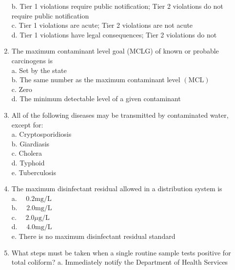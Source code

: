 \begin{enumerate}
b. Tier 1 violations require public notification; Tier 2 violations do not require public notification\\

c. Tier 1 violations are acute; Tier 2 violations are not acute\\

d. Tier 1 violations have legal consequences; Tier 2 violations do not\\


\item The maximum contaminant level goal (MCLG) of known or probable carcinogens is\\
a. Set by the state\\
b. The same number as the maximum contaminant level $(\mathrm{MCL})$\\
c. Zero\\
d. The minimum detectable level of a given contaminant\\

  \item All of the following diseases may be transmitted by contaminated water, except for:\\


a. Cryptosporidiosis\\

b. Giardiasis\\

c. Cholera\\

d. Typhoid\\

e. Tuberculosis\\


\item The maximum disinfectant residual allowed in a distribution system is\\

a. $\quad 0.2 \mathrm{mg} / \mathrm{L}$\\

b. $\quad 2.0 \mathrm{mg} / \mathrm{L}$\\

c. $\quad 2.0 \mu \mathrm{g} / \mathrm{L}$\\

d. $\quad 4.0 \mathrm{mg} / \mathrm{L}$\\

e. There is no maximum disinfectant residual standard\\

\item What steps must be taken when a single routine sample tests positive for total coliform?
a. Immediately notify the Department of Health Services


\end{enumerate}
